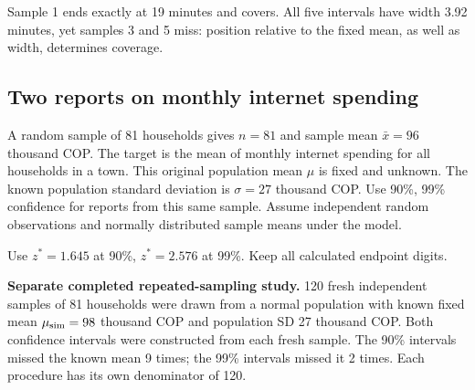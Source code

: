 Sample 1 ends exactly at 19 minutes and covers. All five intervals have width 3.92 minutes, yet samples 3 and 5 miss: position relative to the fixed mean, as well as width, determines coverage.
\par\nopagebreak[4]
\par\vspace{3mm}
\clearpage
\subsection{Two reports on monthly internet spending}
\label{prob:c2-advanced-b}

A random sample of 81 households gives $n=81$ and sample mean $\bar{x}=96$ thousand COP. The target is the mean of monthly internet spending for all households in a town. This original population mean $\mu$ is fixed and unknown. The known population standard deviation is $\sigma=27$ thousand COP. Use 90\%, 99\% confidence for reports from this same sample. Assume independent random observations and normally distributed sample means under the model.

Use $z^*=1.645$ at 90\%, $z^*=2.576$ at 99\%. Keep all calculated endpoint digits.

\textbf{Separate completed repeated-sampling study.} 120 fresh independent samples of 81 households were drawn from a normal population with known fixed mean $\mu_{\rm sim}=98$ thousand COP and population SD 27 thousand COP. Both confidence intervals were constructed from each fresh sample.
The 90\% intervals missed the known mean 9 times; the 99\% intervals missed it 2 times. Each procedure has its own denominator of 120.

